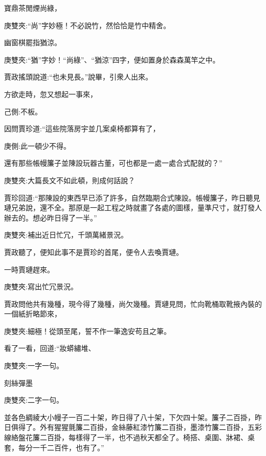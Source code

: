 \begin{poem}
    \begin{pl}寶鼎茶閒煙尚綠，\end{pl}
    \begin{note}庚雙夾:“尚”字妙極！不必說竹，然恰恰是竹中精舍。\end{note}

    \begin{pl}幽窗棋罷指猶涼。\end{pl}
    \begin{note}庚雙夾:“猶”字妙！“尚綠”、“猶涼”四字，便如置身於森森萬竿之中。\end{note}
\end{poem}


\begin{parag}
    賈政搖頭說道:“也未見長。”說畢，引衆人出來。
\end{parag}


\begin{parag}
    方欲走時，忽又想起一事來，\begin{note}己側:不板。\end{note}因問賈珍道:“這些院落房宇並几案桌椅都算有了，\begin{note}庚側:此一頓少不得。\end{note}還有那些帳幔簾子並陳設玩器古董，可也都是一處一處合式配就的？”\begin{note}庚雙夾:大篇長文不如此頓，則成何話說？\end{note}賈珍回道:“那陳設的東西早已添了許多，自然臨期合式陳設。帳幔簾子，昨日聽見璉兄弟說，還不全。那原是一起工程之時就畫了各處的圖樣，量準尺寸，就打發人辦去的。想必昨日得了一半。”\begin{note}庚雙夾:補出近日忙冗，千頭萬緒景況。\end{note}賈政聽了，便知此事不是賈珍的首尾，便令人去喚賈璉。
\end{parag}


\begin{parag}
    一時賈璉趕來。\begin{note}庚雙夾:寫出忙冗景況。\end{note}賈政問他共有幾種，現今得了幾種，尚欠幾種。賈璉見問，忙向靴桶取靴掖內裝的一個紙折略節來，\begin{note}庚雙夾:細極！從頭至尾，誓不作一筆逸安苟且之筆。\end{note}看了一看，回道:“妝蟒繡堆、\begin{note}庚雙夾:一字一句。\end{note}刻絲彈墨\begin{note}庚雙夾:二字一句。\end{note}並各色綢綾大小幔子一百二十架，昨日得了八十架，下欠四十架。簾子二百掛，昨日俱得了。外有猩猩氈簾二百掛，金絲藤紅漆竹簾二百掛，墨漆竹簾二百掛，五彩線絡盤花簾二百掛，每樣得了一半，也不過秋天都全了。椅搭、桌圍、牀裙、桌套，每分一千二百件，也有了。”
\end{parag}


